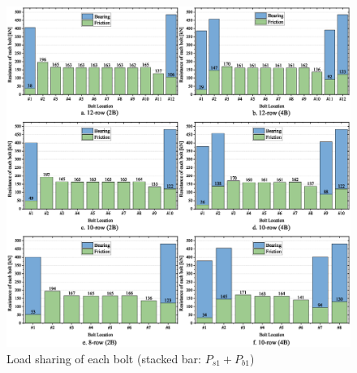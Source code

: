 \begin{figure}
    \includegraphics[width=\linewidth]{imgs/ch7/LS-all.eps}
    \caption{Load sharing of each bolt (stacked bar: $P_{s1}+P_{b1}$)}
    \label{fig-ls-all}
\end{figure}

